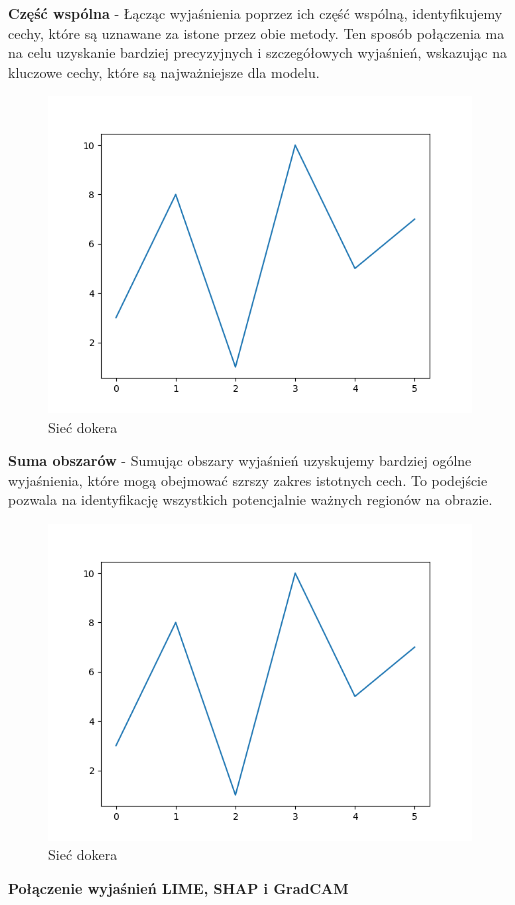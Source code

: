\textbf{Część wspólna} - Łącząc wyjaśnienia poprzez ich część wspólną, identyfikujemy cechy, które są uznawane za istone przez obie metody.
Ten sposób połączenia ma na celu uzyskanie bardziej precyzyjnych i szczegółowych wyjaśnień, wskazując na kluczowe cechy, które są najważniejsze dla modelu.
\begin{figure}
  \centering\includegraphics[width=.6\textwidth]{images/example}
\caption{Sieć dokera \cite{docker_compose_reference}}  \label{rys:network}
\end{figure}

\textbf{Suma obszarów} - Sumując obszary wyjaśnień uzyskujemy bardziej ogólne wyjaśnienia, które mogą obejmować szrszy zakres istotnych cech.
To podejście pozwala na identyfikację wszystkich potencjalnie ważnych regionów na obrazie.
\begin{figure}
  \centering\includegraphics[width=.6\textwidth]{images/example}
\caption{Sieć dokera \cite{docker_compose_reference}}  \label{rys:network}
\end{figure}

\textbf{Połączenie wyjaśnień LIME, SHAP i GradCAM}

